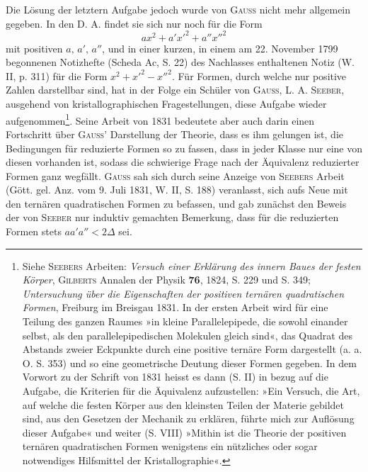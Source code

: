 Die Lösung der letztern Aufgabe jedoch wurde von \textsc{Gauss} nicht mehr allgemein gegeben. In den D. A. findet sie sich nur noch für die Form
\[
ax^2+a'x'^2+a''x''^2
\]
mit positiven \(a,\,a',\,a''\), und in einer kurzen, in einem am 22. November 1799 begonnenen Notizhefte (Scheda Ac, S. 22) des Nachlasses enthaltenen Notiz (W. II, p. 311) für die Form \(x^2+x'^2-x''^2\). Für Formen, durch welche nur positive Zahlen darstellbar sind, hat in der Folge ein Schüler von \textsc{Gauss}, L. A. \textsc{Seeber}, ausgehend von kristallographischen Fragestellungen, diese Aufgabe wieder aufgenommen\footnote{Siehe \textsc{Seebers} Arbeiten: \textit{Versuch einer Erklärung des innern Baues der festen Körper}, \textsc{Gilberts} Annalen der Physik \textbf{76}, 1824, S. 229 und S. 349; \textit{Untersuchung über die Eigenschaften der positiven ternären quadratischen Formen}, Freiburg im Breisgau 1831. In der ersten Arbeit wird für eine Teilung des ganzen Raumes »in kleine Parallelepipede, die sowohl einander selbst, als den parallelepipedischen Molekulen gleich sind«, das Quadrat des Abstands zweier Eckpunkte durch eine positive ternäre Form dargestellt (a. a. O. S. 353) und so eine geometrische Deutung dieser Formen gegeben. In dem Vorwort zu der Schrift von 1831 heisst es dann (S. II) in bezug auf die Aufgabe, die Kriterien für die Äquivalenz aufzustellen: »Ein Versuch, die Art, auf welche die festen Körper aus den kleinsten Teilen der Materie gebildet sind, aus den Gesetzen der Mechanik zu erklären, führte mich zur Auflösung dieser Aufgabe« und weiter (S. VIII) »Mithin ist die Theorie der positiven ternären quadratischen Formen wenigstens ein nützliches oder sogar notwendiges Hilfsmittel der Kristallographie«.}. Seine Arbeit von 1831 bedeutete aber auch darin
\newpage{}
\noindent einen Fortschritt über \textsc{Gauss}’ Darstellung der Theorie, dass es ihm gelungen ist, die Bedingungen für reduzierte Formen so zu fassen, dass in jeder Klasse nur eine von diesen vorhanden ist, sodass die schwierige Frage nach der Äquivalenz reduzierter Formen ganz wegfällt. \textsc{Gauss} sah sich durch seine Anzeige von \textsc{Seebers} Arbeit (Gött. gel. Anz. vom 9. Juli 1831, W. II, S. 188) veranlasst, sich aufs Neue mit den ternären quadratischen Formen zu befassen, und gab zunächst den Beweis der von \textsc{Seeber} nur induktiv gemachten Bemerkung, dass für die reduzierten Formen stets \(aa'a''<2\Delta\) sei.

